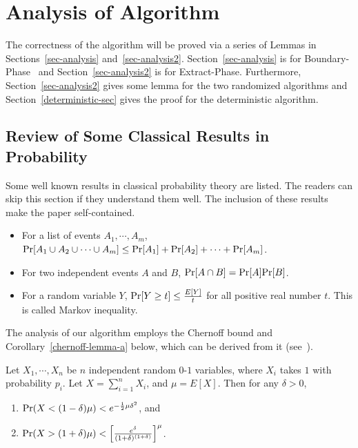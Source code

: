\documentclass[11pt]{article}
\newcommand{\phaseone}{Boundary-Phase}
\newcommand{\phasetwo}{Extract-Phase}
\newcommand{\prob}{{\rm Pr}}
\begin{document}
\section{Analysis of Algorithm}\label{analysis-sec}
 The correctness
of the algorithm will be proved via a series of Lemmas in
Sections~\ref{sec-analysis} and~\ref{sec-analysis2}.
Section~\ref{sec-analysis} is for \phaseone~ and
Section~\ref{sec-analysis2} is for \phasetwo. Furthermore,
Section~\ref{sec-analysis2} gives some lemma for the two randomized
algorithms and Section~\ref{deterministic-sec} gives the proof for
the deterministic algorithm.





\subsection{Review of Some Classical Results in Probability}

Some well known results in classical probability theory are listed.
The readers can skip this section if they understand them well. The
inclusion of these results make the paper self-contained.
\begin{itemize}
\item
 For a list of events $A_1,\cdots, A_m$,
$\prob[A_1\cup A_2\cup \cdots \cup A_m]\le
\prob[A_1]+\prob[A_2]+\cdots+\prob[A_m]$.
\item
For two independent events $A$ and $B$, $\prob[A\cap
B]=\prob[A]\prob[B]$.
\item
For a random variable $Y$, $\prob[Y\ge t]\le {E[Y]\over t}$ for all
positive real number $t$. This is called Markov inequality.
\end{itemize}


The analysis of our algorithm employs the Chernoff bound
\cite{MotwaniRaghavan00} and Corollary~\ref{chernoff-lemma-a} below,
which can be derived from it
(see~\cite{LiMaWang99}).



\begin{theorem}\label{chernoff-theorem}
Let $X_1,\cdots, X_n$ be $n$ independent random $0$-$1$ variables,
where $X_i$ takes $1$ with probability $p_i$. Let $X=\sum_{i=1}^n
X_i$, and $\mu=E[X]$. Then for any $\delta>0$,
\begin{enumerate}
\item $\Pr(X<(1-\delta)\mu)<e^{-{1\over 2}\mu\delta^2}$, and
\item
$\Pr(X>(1+\delta)\mu)<\left[{e^{\delta}\over
(1+\delta)^{(1+\delta)}}\right]^{\mu}$.
\end{enumerate}
\end{theorem}
\end{document}
